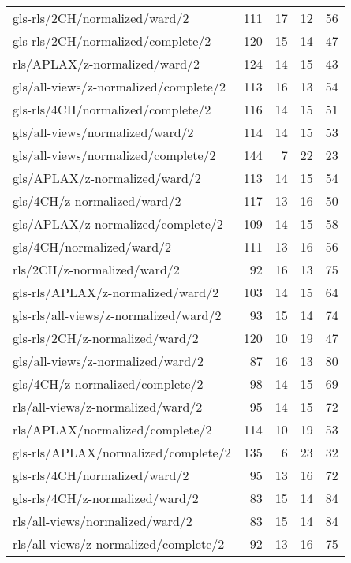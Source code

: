 \begin{longtable}{lrrrr}
    gls-rls/2CH/normalized/ward/2             & 111 & 17 & 12 & 56 \\
    gls-rls/2CH/normalized/complete/2         & 120 & 15 & 14 & 47 \\
    rls/APLAX/z-normalized/ward/2             & 124 & 14 & 15 & 43 \\
    gls/all-views/z-normalized/complete/2     & 113 & 16 & 13 & 54 \\
    gls-rls/4CH/normalized/complete/2         & 116 & 14 & 15 & 51 \\
    gls/all-views/normalized/ward/2           & 114 & 14 & 15 & 53 \\
    gls/all-views/normalized/complete/2       & 144 &  7 & 22 & 23 \\
    gls/APLAX/z-normalized/ward/2             & 113 & 14 & 15 & 54 \\
    gls/4CH/z-normalized/ward/2               & 117 & 13 & 16 & 50 \\
    gls/APLAX/z-normalized/complete/2         & 109 & 14 & 15 & 58 \\
    gls/4CH/normalized/ward/2                 & 111 & 13 & 16 & 56 \\
    rls/2CH/z-normalized/ward/2               &  92 & 16 & 13 & 75 \\
    gls-rls/APLAX/z-normalized/ward/2         & 103 & 14 & 15 & 64 \\
    gls-rls/all-views/z-normalized/ward/2     &  93 & 15 & 14 & 74 \\
    gls-rls/2CH/z-normalized/ward/2           & 120 & 10 & 19 & 47 \\
    gls/all-views/z-normalized/ward/2         &  87 & 16 & 13 & 80 \\
    gls/4CH/z-normalized/complete/2           &  98 & 14 & 15 & 69 \\
    rls/all-views/z-normalized/ward/2         &  95 & 14 & 15 & 72 \\
    rls/APLAX/normalized/complete/2           & 114 & 10 & 19 & 53 \\
    gls-rls/APLAX/normalized/complete/2       & 135 &  6 & 23 & 32 \\
    gls-rls/4CH/normalized/ward/2             &  95 & 13 & 16 & 72 \\
    gls-rls/4CH/z-normalized/ward/2           &  83 & 15 & 14 & 84 \\
    rls/all-views/normalized/ward/2           &  83 & 15 & 14 & 84 \\
    rls/all-views/z-normalized/complete/2     &  92 & 13 & 16 & 75 \\

\end{longtable}
